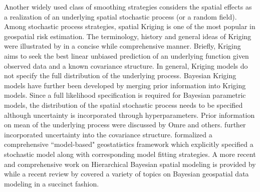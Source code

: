 	Another widely used class of smoothing strategies considers the spatial effects as a realization of an underlying spatial stochastic process (or a random field). Among stochastic process strategies, spatial Kriging is one of the most popular in geospatial risk estimation. The terminology, history and general ideas of Kriging were illustrated by \cite{cressie1990origins} in a concise while comprehensive manner. Briefly, Kriging aims to seek the best linear unbiased prediction of an underlying function given observed data and a known covariance structure. In general, Kriging models do not specify the full distribution of the underlying process.\citep{stein2012interpolation,cressie1992statistics} Bayesian Kriging models have further been developed by merging prior information into Kriging models. Since a full likelihood specification is required for Bayesian parametric models, the distribution of the spatial stochastic process needs to be specified although uncertainty is incorporated through hyperparameters. Prior information on mean of the underlying process were discussed by Omre and others.\citep{omre1987bayesian,omre1989bayesian} \cite{handcock1993bayesian} further incorporated uncertainty into the covariance structure. \cite{diggle2002bayesian} formalized a comprehensive ``model-based" geostatistics framework which explicitly specified a stochastic model along with corresponding model fitting strategies.\citep{diggle2003introduction} A more recent and comprehensive work on Hierarchical Bayesian spatial modeling is provided by \cite{banerjee2014hierarchical} while a recent review by \cite{gelfand2017bayesian}  covered a variety of topics on Bayesian geospatial data modeling in a succinct fashion.
	
